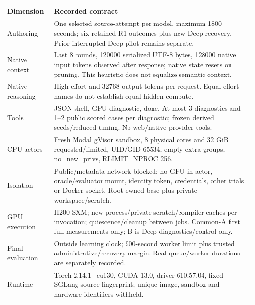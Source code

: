\documentclass[11pt,letterpaper]{article}
\begin{document}
\small\begin{tabularx}{\linewidth}{@{}lX@{}}\toprule\textbf{Dimension} & \textbf{Recorded contract}\\\midrule

Authoring & One selected source-attempt per model, maximum 1800 seconds; six retained R1 outcomes plus new Deep recovery. Prior interrupted Deep pilot remains separate.\\

Native context & Last 8 rounds, 120000 serialized UTF-8 bytes, 128000 native input tokens observed after response; native state resets on pruning. This heuristic does not equalize semantic context.\\

Native reasoning & High effort and 32768 output tokens per request. Equal effort names do not establish equal hidden compute.\\

Tools & JSON shell, GPU diagnostic, done. At most 3 diagnostics and 1--2 public scored cases per diagnostic; frozen derived seeds/reduced timing. No web/native provider tools.\\

CPU actors & Fresh Modal gVisor sandbox, 8 physical cores and 32 GiB requested/limited, UID/GID 65534, empty extra groups, no\_new\_privs, RLIMIT\_NPROC 256.\\

Isolation & Public/metadata network blocked; no GPU in actor, oracle/evaluator mount, identity token, credentials, other trials or Docker socket. Root-owned base plus private workspace/scratch.\\

GPU execution & H200 SXM; new process/private scratch/compiler caches per invocation; quiescence/cleanup between jobs. Common-A first full measurements only; B is Deep diagnostics/control only.\\

Final evaluation & Outside learning clock; 900-second worker limit plus trusted administrative/recovery margin. Real queue/worker durations are separately recorded.\\

Runtime & Torch 2.14.1+cu130, CUDA 13.0, driver 610.57.04, fixed SGLang source fingerprint; unique image, sandbox and hardware identifiers withheld.\\

\bottomrule\end{tabularx}\normalsize
\end{document}
